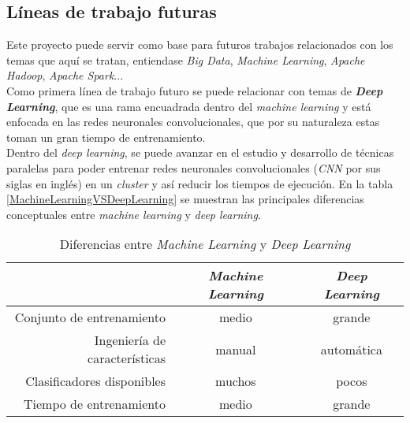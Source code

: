 \subsection*{Líneas de trabajo futuras}
Este proyecto puede servir como base para futuros trabajos relacionados con los temas que aquí se tratan, 
entiendase \textit{Big Data}, \textit{Machine Learning}, \textit{Apache Hadoop}, \textit{Apache Spark}...\\
Como primera línea de trabajo futuro se puede relacionar con temas de \textbf{\textit{Deep Learning}}, que es una rama encuadrada dentro del \textit{machine learning} 
y está enfocada en las redes neuronales convolucionales, que por su naturaleza estas toman un gran 
tiempo de entrenamiento.\\
Dentro del \textit{deep learning}, se puede avanzar en el estudio y desarrollo de técnicas paralelas para poder
entrenar redes neuronales convolucionales (\textit{CNN} por sus siglas en inglés) en un \textit{cluster} 
y así reducir los tiempos de ejecución.
En la tabla \autoref{MachineLearningVSDeepLearning} se muestran las principales diferencias conceptuales
entre \textit{machine learning} y \textit{deep learning}.

\begin{table}[!htpb]
  \centering
  \begin{tabular}{|r|c|c|} %
    \hline
    & \textbf{\textit{Machine Learning}} & \textbf{\textit{Deep Learning}} \\ \hline
    Conjunto de entrenamiento & medio & grande \\ \hline
    Ingeniería de características & manual & automática \\ \hline
    Clasificadores disponibles & muchos & pocos \\ \hline
    Tiempo de entrenamiento & medio & grande \\ \hline
  \end{tabular}
   \caption[Diferencias entre \textit{Machine Learning} y \textit{Deep Learning}]
           {Diferencias entre \textit{Machine Learning} y \textit{Deep Learning}}
   \label{MachineLearningVSDeepLearning}
\end{table}


